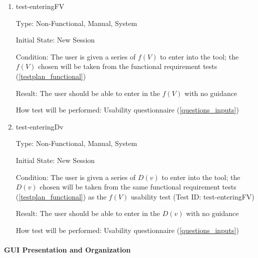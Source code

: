 \documentclass[12pt, titlepage]{article}
\begin{document}
\begin{enumerate}

\item{test-enteringFV}

Type: Non-Functional, Manual, System
					
Initial State: New Session
					
Condition: The user is given a series of $f(V)$ to enter into the tool; the 
$f(V)$ chosen will be taken from the functional requirement tests 
(\ref{testplan_functional})
					
Result: The user should be able to enter in the $f(V)$ with no guidance
					
How test will be performed: Usability questionnaire (\ref{questions_inputs})\\
					
\item{test-enteringDv}

Type: Non-Functional, Manual, System
					
Initial State: New Session
					
Condition: The user is given a series of $D(v)$ to enter into the tool; the 
$D(v)$ chosen will be taken from the same functional requirement tests 
(\ref{testplan_functional}) as the $f(V)$ usability test (Test ID: 
test-enteringFV)
					
Result: The user should be able to enter in the $D(v)$ with no guidance
					
How test will be performed: Usability questionnaire (\ref{questions_inputs})\\

\end{enumerate}

\paragraph{GUI Presentation and Organization}
\end{document}
